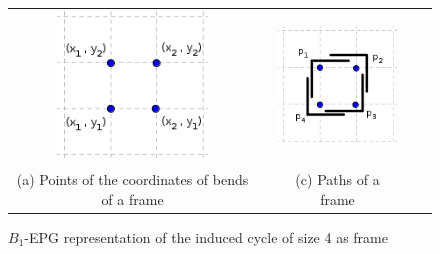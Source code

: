 \begin{figure}[htb]
  \centering
  \begin{tabular}{c c c c c }
    \includegraphics[width=4cm]{./img/dispositionFrameInGrid.png}    
    & &
 \includegraphics[width=4cm]{./img/frameInGrid.png} \\%
    {\footnotesize (a) Points of the coordinates of bends of a frame}  
    & & {\footnotesize (c) Paths of a frame} %
  \end{tabular}
  \caption{$B_{1}$-EPG representation of the induced cycle of size 4 as frame}\label{fig:frameInGrid}
\end{figure} 